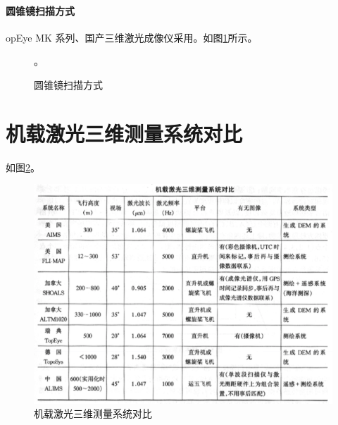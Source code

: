 \paragraph{圆锥镜扫描方式}opEye MK 系列、国产三维激光成像仪采用。如图\ref{fig:圆锥镜扫描方式}所示。
\begin{figure}[htbp]
	\centering
	\caption{圆锥镜扫描方式}。
	\label{fig:圆锥镜扫描方式}
\end{figure}
\section{机载激光三维测量系统对比}
如图\ref{fig:机载激光三维测量系统对比}。
\begin{figure}[!htbp]
	\centering
	\includegraphics[width=1\linewidth]{figure/Chapter1/机载激光三维测量系统对比}
	\caption{机载激光三维测量系统对比}
	\label{fig:机载激光三维测量系统对比}
\end{figure}
